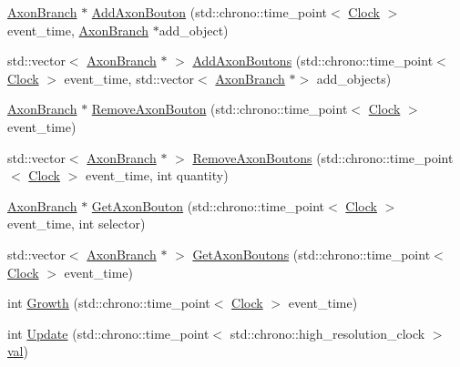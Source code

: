 \begin{DoxyCompactItemize}
\item 
\mbox{\hyperlink{class_axon_branch}{Axon\+Branch}} $\ast$ \mbox{\hyperlink{class_axon_branch_a88e6af84b45bb6f6f8900a6d4aec446c}{Add\+Axon\+Bouton}} (std\+::chrono\+::time\+\_\+point$<$ \mbox{\hyperlink{universe_8h_a0ef8d951d1ca5ab3cfaf7ab4c7a6fd80}{Clock}} $>$ event\+\_\+time, \mbox{\hyperlink{class_axon_branch}{Axon\+Branch}} $\ast$add\+\_\+object)
\item 
std\+::vector$<$ \mbox{\hyperlink{class_axon_branch}{Axon\+Branch}} $\ast$ $>$ \mbox{\hyperlink{class_axon_branch_a788ca8cc7e6f60f07b9e19a8e3022b64}{Add\+Axon\+Boutons}} (std\+::chrono\+::time\+\_\+point$<$ \mbox{\hyperlink{universe_8h_a0ef8d951d1ca5ab3cfaf7ab4c7a6fd80}{Clock}} $>$ event\+\_\+time, std\+::vector$<$ \mbox{\hyperlink{class_axon_branch}{Axon\+Branch}} $\ast$$>$ add\+\_\+objects)
\item 
\mbox{\hyperlink{class_axon_branch}{Axon\+Branch}} $\ast$ \mbox{\hyperlink{class_axon_branch_a06753a2a61941a59d86510e51ba44b15}{Remove\+Axon\+Bouton}} (std\+::chrono\+::time\+\_\+point$<$ \mbox{\hyperlink{universe_8h_a0ef8d951d1ca5ab3cfaf7ab4c7a6fd80}{Clock}} $>$ event\+\_\+time)
\item 
std\+::vector$<$ \mbox{\hyperlink{class_axon_branch}{Axon\+Branch}} $\ast$ $>$ \mbox{\hyperlink{class_axon_branch_a815e055e37f89fb2627b250c5b95d406}{Remove\+Axon\+Boutons}} (std\+::chrono\+::time\+\_\+point$<$ \mbox{\hyperlink{universe_8h_a0ef8d951d1ca5ab3cfaf7ab4c7a6fd80}{Clock}} $>$ event\+\_\+time, int quantity)
\item 
\mbox{\hyperlink{class_axon_branch}{Axon\+Branch}} $\ast$ \mbox{\hyperlink{class_axon_branch_a6fa6eea91e72fd142f3d691f7ca4c99a}{Get\+Axon\+Bouton}} (std\+::chrono\+::time\+\_\+point$<$ \mbox{\hyperlink{universe_8h_a0ef8d951d1ca5ab3cfaf7ab4c7a6fd80}{Clock}} $>$ event\+\_\+time, int selector)
\item 
std\+::vector$<$ \mbox{\hyperlink{class_axon_branch}{Axon\+Branch}} $\ast$ $>$ \mbox{\hyperlink{class_axon_branch_aafadba57924686a8087c7f7758889045}{Get\+Axon\+Boutons}} (std\+::chrono\+::time\+\_\+point$<$ \mbox{\hyperlink{universe_8h_a0ef8d951d1ca5ab3cfaf7ab4c7a6fd80}{Clock}} $>$ event\+\_\+time)
\item 
int \mbox{\hyperlink{class_axon_branch_a6e434a57873ab0fdbc72cf7ecc7228ed}{Growth}} (std\+::chrono\+::time\+\_\+point$<$ \mbox{\hyperlink{universe_8h_a0ef8d951d1ca5ab3cfaf7ab4c7a6fd80}{Clock}} $>$ event\+\_\+time)
\item 
int \mbox{\hyperlink{class_axon_branch_a5a80bcccdc2be9f77fca25131937b52f}{Update}} (std\+::chrono\+::time\+\_\+point$<$ std\+::chrono\+::high\+\_\+resolution\+\_\+clock $>$ \mbox{\hyperlink{glad_8h_a26942fd2ed566ef553eae82d2c109c8f}{val}})
\end{DoxyCompactItemize}
